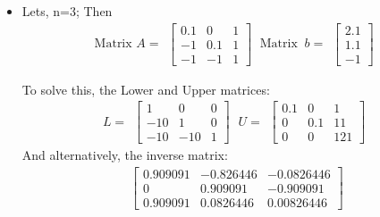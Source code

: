 \documentclass[12pt]{beamer}
\begin{document}
\begin{frame}
\begin{itemize}
\item Lets, n=3; Then\\
\begin{equation*}
\textrm{Matrix }A =
\begin{matrix}
	\begin{bmatrix}
	0.1 &	0 &	1\\	
	-1 &	0.1 &	1\\	
	-1 &	-1 &	1	 
	\end{bmatrix}
\end{matrix}
\ \textrm{Matrix }\ b =
\begin{matrix}
	\begin{bmatrix}
	2.1\\1.1\\-1
	\end{bmatrix}
\end{matrix}
\end{equation*}

To solve this, the Lower and Upper matrices:
\begin{equation*}
L =
\begin{matrix}
	\begin{bmatrix}
	1 &	0 &	0\\	
	-10 &	1 &	0\\	
	-10 &	-10 &	1
	\end{bmatrix}
\end{matrix}
\ U =
\begin{matrix}
	\begin{bmatrix}
	0.1	& 0 &	1\\	
	0 &	0.1 &	11\\	
	0 &	0 &	121	
	\end{bmatrix}
\end{matrix}
\end{equation*}
And alternatively, the inverse matrix:
\begin{equation*}
\begin{matrix}
	\begin{bmatrix}
0.909091 &	-0.826446 &	-0.0826446\\	
0 &	0.909091 &	-0.909091\\	
0.909091 &	0.0826446 &	0.00826446	
	\end{bmatrix}
\end{matrix}
\end{equation*}
\end{itemize}
\end{frame}
\end{document}
